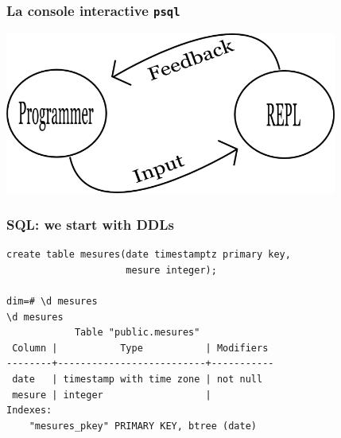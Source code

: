 \documentclass{beamer}
\begin{document}
\begin{frame}
  \frametitle{La console interactive \texttt{psql}}

  \begin{center}
    \includegraphics[height=2.1in]{repl.png}
  \end{center}
\end{frame}


\begin{frame}[fragile]
  \frametitle{SQL: we start with DDLs}

  \vfill

\begin{example}[DDL]
\begin{verbatim}
create table mesures(date timestamptz primary key,
                     mesure integer);

dim=# \d mesures
\d mesures
            Table "public.mesures"
 Column |           Type           | Modifiers 
--------+--------------------------+-----------
 date   | timestamp with time zone | not null
 mesure | integer                  | 
Indexes:
    "mesures_pkey" PRIMARY KEY, btree (date)
\end{verbatim}
\end{example}
\end{frame}
\end{document}
